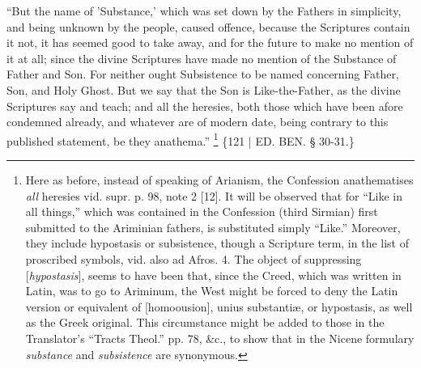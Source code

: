 ``But the name of 'Substance,'
which was set down by the Fathers in simplicity, and being unknown by
the people, caused offence, because the Scriptures contain it not, it
has seemed good to take away, and for the future to make no mention of
it at all; since the divine Scriptures have made no mention of the
Substance of Father and Son. For neither ought Subsistence to be named
concerning Father, Son, and Holy Ghost. But we say that the Son is
Like-the-Father, as the divine Scriptures say and teach; and all the
heresies, both those which have been afore condemned already, and
whatever are of modern date, being contrary to this published
statement, be they anathema.'' \footnote{Here as before, instead of speaking of Arianism, the Confession
anathematises \emph{all} heresies vid. supr. p. 98, note 2 [12]. It will
be observed that for ``Like in all things,'' which was contained in the
Confession (third Sirmian) first submitted to the Ariminian fathers,
is substituted simply ``Like.'' Moreover, they include hypostasis or
subsistence, though a Scripture term, in the list of proscribed
symbols, vid. also ad Afros. 4. The object of suppressing [\emph{hypostasis}],
seems to have been that, since the Creed, which was written in Latin,
was to go to Ariminum, the West might be forced to deny the Latin
version or equivalent of [homoousion], unius substantiæ, or
hypostasis, as well as the Greek original. This circumstance might be
added to those in the Translator's ``Tracts Theol.'' pp. 78, \&c., to
show that in the Nicene formulary \emph{substance} and \emph{subsistence}
are synonymous.} \{121 | ED. BEN.
§ 30-31.\}

